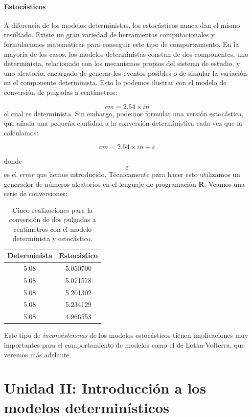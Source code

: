 \documentclass[
]{book}
\begin{document}
\hypertarget{estocuxe1sticos}{%
\subsubsection{Estocásticos}\label{estocuxe1sticos}}

A diferencia de los modelos deterministas, los estocásticos nunca dan el mismo resultado. Existe un gran variedad de herramientas computacionales y formulaciones matemáticas para conseguir este tipo de comportamiento. En la mayoría de los casos, los modelos deterministas constan de dos componentes, uno determinista, relacionado con los mecanismos propios del sistema de estudio, y uno aleatorio, encargado de generar los eventos posibles o de simular la variación en el componente determinista. Esto lo podemos ilustrar con el modelo de conversión de pulgadas a centímetros:

\[
cm = 2.54 \times in
\]
el cual es determinista. Sin embargo, podemos formular una versión estocástica, que añada una pequeña cantidad a la conversión determinística cada vez que la calculamos:

\[
cm = 2.54 \times in + \varepsilon
\]

donde \[\varepsilon\] es el \emph{error} que hemos introducido. Técnicamente para hacer esto utilizamos un generador de números aleatorios en el lenguaje de programación \textbf{R}. Veamos una serie de conversiones:

\begin{table}

\caption{\label{tab:unnamed-chunk-18}Cinco realizaciones para la conversión de dos pulgadas a centímetros con el modelo determinista y estocástico.}
\centering
\begin{tabular}[t]{c|c}
\hline
Determinista & Estocástico\\
\hline
5.08 & 5.050700\\
\hline
5.08 & 5.071578\\
\hline
5.08 & 5.201302\\
\hline
5.08 & 5.234129\\
\hline
5.08 & 4.966553\\
\hline
\end{tabular}
\end{table}

Este tipo de \emph{inconsistencias} de los modelos estocásticos tienen implicaciones muy importantes para el comportamiento de modelos como el de Lotka-Volterra, que veremos más adelante.

\hypertarget{unidad-ii-introducciuxf3n-a-los-modelos-determinuxedsticos}{%
\chapter{Unidad II: Introducción a los modelos determinísticos}\label{unidad-ii-introducciuxf3n-a-los-modelos-determinuxedsticos}}
\end{document}
